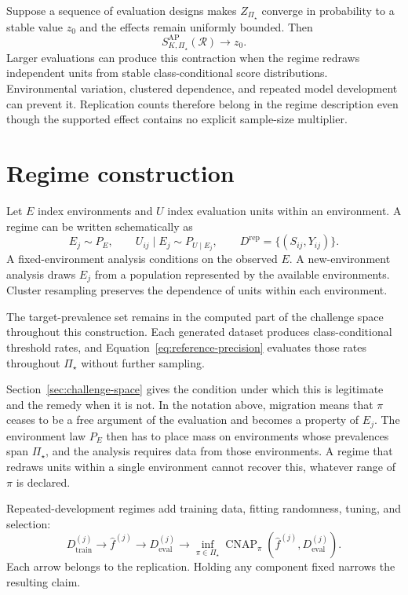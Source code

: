 \documentclass[11pt]{article}
\newcommand{\CNAP}{\operatorname{CNAP}}
\newcommand{\Regime}{\mathcal{R}}
\newcommand{\PSet}{\Pi_\star}
\theoremstyle{remark}
\begin{document}
Suppose a sequence of evaluation designs makes $Z_{\PSet}$ converge in probability to a stable value $z_0$ and the effects remain uniformly bounded. Then
\[
S_{K,\PSet}^{\mathrm{AP}}(\Regime)
\longrightarrow
z_0.
\]
Larger evaluations can produce this contraction when the regime redraws independent units from stable class-conditional score distributions. Environmental variation, clustered dependence, and repeated model development can prevent it. Replication counts therefore belong in the regime description even though the supported effect contains no explicit sample-size multiplier.

\section{Regime construction}
\label{app:regime}

Let $E$ index environments and $U$ index evaluation units within an environment. A regime can be written schematically as
\[
E_j\sim P_E,
\qquad
U_{ij}\mid E_j\sim P_{U\mid E_j},
\qquad
D^{\mathrm{rep}}=\{(S_{ij},Y_{ij})\}.
\]
A fixed-environment analysis conditions on the observed $E$. A new-environment analysis draws $E_j$ from a population represented by the available environments. Cluster resampling preserves the dependence of units within each environment.

The target-prevalence set remains in the computed part of the challenge space throughout this construction. Each generated dataset produces class-conditional threshold rates, and Equation~\eqref{eq:reference-precision} evaluates those rates throughout $\PSet$ without further sampling.

Section~\ref{sec:challenge-space} gives the condition under which this is legitimate and the remedy when it is not. In the notation above, migration means that $\pi$ ceases to be a free argument of the evaluation and becomes a property of $E_j$. The environment law $P_E$ then has to place mass on environments whose prevalences span $\PSet$, and the analysis requires data from those environments. A regime that redraws units within a single environment cannot recover this, whatever range of $\pi$ is declared.

Repeated-development regimes add training data, fitting randomness, tuning, and selection:
\[
D_{\mathrm{train}}^{(j)}
\longrightarrow
\widehat f^{(j)}
\longrightarrow
D_{\mathrm{eval}}^{(j)}
\longrightarrow
\inf_{\pi\in\PSet}
\CNAP_\pi(\widehat f^{(j)},D_{\mathrm{eval}}^{(j)}).
\]
Each arrow belongs to the replication. Holding any component fixed narrows the resulting claim.
\end{document}
